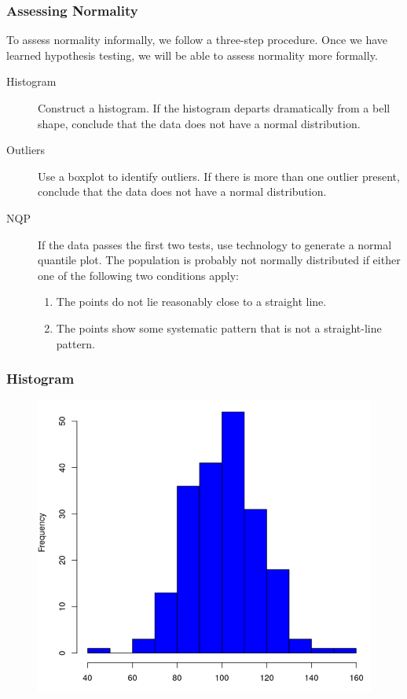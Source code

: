 \documentclass[xcolor=dvipsnames]{beamer}
\begin{document}
\begin{frame}
  \frametitle{Assessing Normality}
To assess normality informally, we follow a three-step procedure. Once
we have learned hypothesis testing, we will be able to assess
normality more formally.
\begin{description}
\item[Histogram] Construct a histogram. If the histogram departs
  dramatically from a bell shape, conclude that the data does not
  have a normal distribution.
\item[Outliers] Use a boxplot to identify outliers. If there is
  more than one outlier present, conclude that the data does not
  have a normal distribution.
\item[NQP] If the data passes the first two
  tests, use technology to generate a \alert{normal quantile
    plot}. The population is probably not normally distributed if
  either one of the following two conditions apply:
  \begin{enumerate}
  \item The points do not lie reasonably close to a straight line.
  \item The points show some systematic pattern that is not a
    straight-line pattern.
  \end{enumerate}
\end{description}
\end{frame}

\begin{frame}
  \frametitle{Histogram}
\begin{figure}[h]
\includegraphics[scale=.4]{./diagrams/an-hist.png}
\end{figure}
\end{frame}
\end{document}
